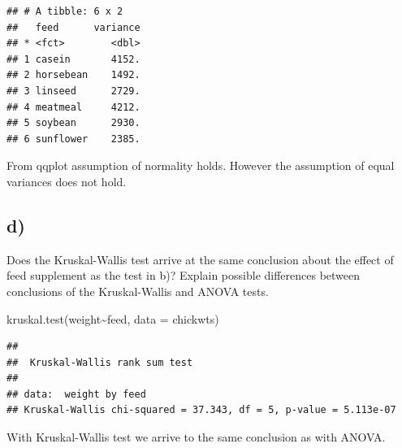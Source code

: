 \documentclass[
]{article}
\newenvironment{Shaded}{\begin{snugshade}}{\end{snugshade}}
\newcommand{\AttributeTok}[1]{\textcolor[rgb]{0.77,0.63,0.00}{#1}}
\newcommand{\FunctionTok}[1]{\textcolor[rgb]{0.00,0.00,0.00}{#1}}
\newcommand{\NormalTok}[1]{#1}
\newcommand{\SpecialCharTok}[1]{\textcolor[rgb]{0.00,0.00,0.00}{#1}}
\begin{document}
\begin{verbatim}
## # A tibble: 6 x 2
##   feed      variance
## * <fct>        <dbl>
## 1 casein       4152.
## 2 horsebean    1492.
## 3 linseed      2729.
## 4 meatmeal     4212.
## 5 soybean      2930.
## 6 sunflower    2385.
\end{verbatim}

From qqplot assumption of normality holds. However the assumption of
equal variances does not hold.

\hypertarget{d-3}{%
\subsection{d)}\label{d-3}}

Does the Kruskal-Wallis test arrive at the same conclusion about the
effect of feed supplement as the test in b)? Explain possible
differences between conclusions of the Kruskal-Wallis and ANOVA tests.

\begin{Shaded}
\begin{Highlighting}[]
\FunctionTok{kruskal.test}\NormalTok{(weight}\SpecialCharTok{\textasciitilde{}}\NormalTok{feed, }\AttributeTok{data =}\NormalTok{ chickwts)}
\end{Highlighting}
\end{Shaded}

\begin{verbatim}
## 
##  Kruskal-Wallis rank sum test
## 
## data:  weight by feed
## Kruskal-Wallis chi-squared = 37.343, df = 5, p-value = 5.113e-07
\end{verbatim}

With Kruskal-Wallis test we arrive to the same conclusion as with ANOVA.
\end{document}
